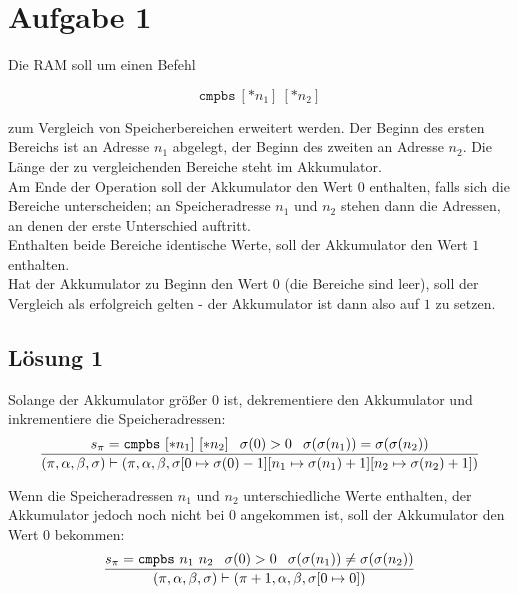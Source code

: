 \documentclass[main.tex]{subfiles}
\begin{document}
\section{Aufgabe 1}

Die RAM soll um einen Befehl

$$
    \mathtt{cmpbs} \ [ *n_{1}] \ [ *n_{2}]
$$

zum Vergleich von Speicherbereichen erweitert werden.
Der Beginn des ersten Bereichs ist an Adresse $n_1$ abgelegt, der Beginn des zweiten an Adresse $n_2$. Die Länge
der zu vergleichenden Bereiche steht im Akkumulator.\\
Am Ende der Operation soll der Akkumulator den Wert $0$ enthalten, falls sich die Bereiche unterscheiden;
an Speicheradresse $n_1$ und $n_2$ stehen dann die Adressen, an denen der erste Unterschied auftritt.\\
Enthalten beide Bereiche identische Werte, soll der Akkumulator den Wert $1$ enthalten.\\
Hat der Akkumulator zu Beginn den Wert $0$ (die Bereiche sind leer), soll der Vergleich als erfolgreich gelten -
der Akkumulator ist dann also auf $1$ zu setzen.

\subsection*{Lösung 1}

Solange der Akkumulator größer 0 ist, dekrementiere den Akkumulator und inkrementiere die Speicheradressen:
\begin{equation*}
    \frac{
        s_{\pi } =\mathtt{cmpbs} \ [*n_{1}] \ [*n_{2}] \kern+0.4em \kern+0.4em \sigma ( 0)  >0\kern+0.4em \kern+0.4em \sigma ( \sigma ( n_{1})) =\sigma ( \sigma ( n_{2}))
    }{
        ( \pi ,\alpha ,\beta ,\sigma ) \vdash ( \pi ,\alpha ,\beta ,\sigma [ 0\mapsto \sigma ( 0) -1][ n_{1} \mapsto \sigma ( n_{1}) +1][ n_{2} \mapsto \sigma ( n_{2}) +1])
    }
\end{equation*}


Wenn die Speicheradressen $n_{1}$ und $n_{2}$ unterschiedliche Werte enthalten, der Akkumulator jedoch noch nicht bei $0$ angekommen ist, soll der Akkumulator den Wert $0$ bekommen:
\begin{equation*}
    \frac{
        s_{\pi } =\mathtt{cmpbs} \ n_{1} \ n_{2} \kern+0.4em \kern+0.4em \sigma ( 0)  >0\kern+0.4em \kern+0.4em \sigma ( \sigma ( n_{1})) \neq \sigma ( \sigma ( n_{2}))
    }{
        ( \pi ,\alpha ,\beta ,\sigma ) \vdash ( \pi +1,\alpha ,\beta ,\sigma [ 0\mapsto 0])
    }
\end{equation*}
\end{document}

